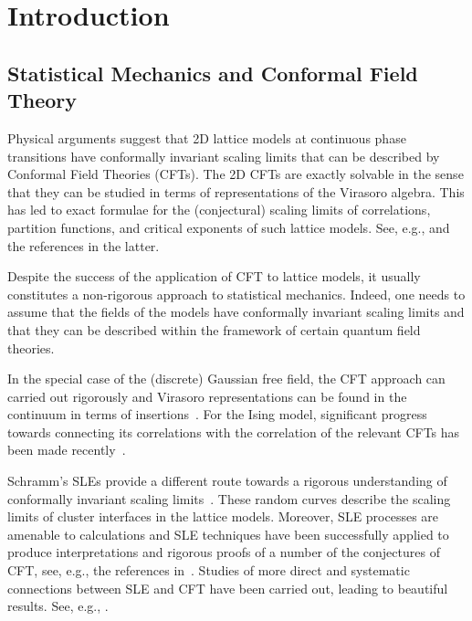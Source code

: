 \documentclass[12pt,oneside,english]{amsart}
\numberwithin{equation}{section}
\numberwithin{figure}{section}
\theoremstyle{plain}
\theoremstyle{plain}
\theoremstyle{plain}
\theoremstyle{plain}
\theoremstyle{remark}
\theoremstyle{definition}
\theoremstyle{plain}
\theoremstyle{plain}
\numberwithin{thm}{section}
\begin{document}
\maketitle

\newpage

\tableofcontents

\newpage



\section{Introduction}

\subsection{\label{subsec:stat-mech-and-cft}Statistical Mechanics and Conformal
Field Theory }

Physical arguments suggest that 2D lattice models at continuous phase
transitions have conformally invariant scaling limits that can be
described by Conformal Field Theories (CFTs). The 2D CFTs are exactly
solvable in the sense that they can be studied in terms of representations
of the Virasoro algebra. This has led to exact formulae for the (conjectural)
scaling limits of correlations, partition functions, and critical
exponents of such lattice models. See, e.g., 
\cite{belavin-polyakov-zamolodchikov-i,belavin-polyakov-zamolodchikov-ii,
di-francesco-mathieu-senechal,mussardo}
and the references in the latter.

Despite the success of the application of CFT to lattice models,
it usually constitutes a non-rigorous approach to statistical mechanics.
Indeed, one needs to assume that the fields of the models have conformally
invariant scaling limits and that they can be described within the
framework of certain quantum field theories.

In the special case of the (discrete) Gaussian free field, the CFT
approach can carried out rigorously and Virasoro representations can
be found in the continuum in terms of
insertions~\cite{gawedzki,kang-makarov}.
For the Ising model, significant progress towards connecting its correlations
with the correlation of the relevant CFTs has been made
recently~\cite{chelkak-hongler-izyurov,hongler,hongler-smirnov}.

Schramm's SLEs provide a different route towards a rigorous understanding
of conformally invariant scaling limits~\cite{schramm-i,schramm-iii}.
These random curves describe the scaling limits of cluster interfaces
in the lattice models. Moreover, SLE processes are amenable to calculations
and SLE techniques have been successfully applied to produce interpretations
and rigorous proofs of a number of the conjectures of CFT, see, e.g.,
the references in~\cite{kang-makarov}. Studies of more direct and
systematic connections between SLE and CFT have been carried out,
leading to beautiful results. See, e.g., 
\cite{bauer-bernard-i,doyon-riva-cardy,friedrich-werner,kang-makarov,kytola,
dubedat-iv,dubedat-v,flores-kleban}.
\end{document}
